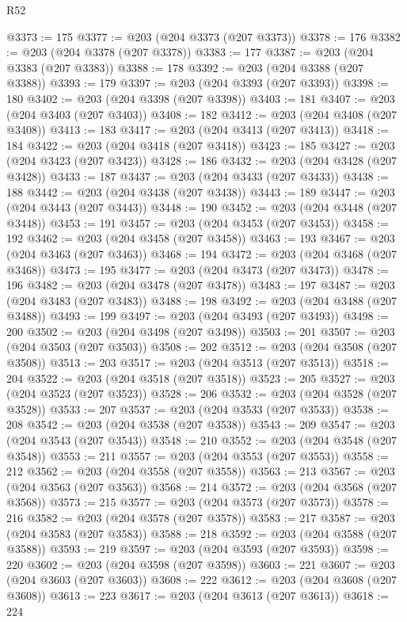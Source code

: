 \begin{lexlean}{R52}
\begin{coremodule}
{{{{{{{{{{{{{{{{{{{{{{{{{{{{{{{{{{{{{{{{{{{{{{{{{{{{{{{{{{{{{{{{{{{{{{{{{{{{{{{{{{{{{{{{{{{{{{{{{{{{{{{{{{{{{{{{{{{{{{{{{{{{{{{{{{{{{{{{{{{{{{{{{{{{{{{{{{{{{{{{{{{{{{{{{{{{{{{{{{{{{{{{{{{{{{{{{{{{{{@3373 := 175
@3377 := @203 (@204 @3373 (@207 @3373))
@3378 := 176
@3382 := @203 (@204 @3378 (@207 @3378))
@3383 := 177
@3387 := @203 (@204 @3383 (@207 @3383))
@3388 := 178
@3392 := @203 (@204 @3388 (@207 @3388))
@3393 := 179
@3397 := @203 (@204 @3393 (@207 @3393))
@3398 := 180
@3402 := @203 (@204 @3398 (@207 @3398))
@3403 := 181
@3407 := @203 (@204 @3403 (@207 @3403))
@3408 := 182
@3412 := @203 (@204 @3408 (@207 @3408))
@3413 := 183
@3417 := @203 (@204 @3413 (@207 @3413))
@3418 := 184
@3422 := @203 (@204 @3418 (@207 @3418))
@3423 := 185
@3427 := @203 (@204 @3423 (@207 @3423))
@3428 := 186
@3432 := @203 (@204 @3428 (@207 @3428))
@3433 := 187
@3437 := @203 (@204 @3433 (@207 @3433))
@3438 := 188
@3442 := @203 (@204 @3438 (@207 @3438))
@3443 := 189
@3447 := @203 (@204 @3443 (@207 @3443))
@3448 := 190
@3452 := @203 (@204 @3448 (@207 @3448))
@3453 := 191
@3457 := @203 (@204 @3453 (@207 @3453))
@3458 := 192
@3462 := @203 (@204 @3458 (@207 @3458))
@3463 := 193
@3467 := @203 (@204 @3463 (@207 @3463))
@3468 := 194
@3472 := @203 (@204 @3468 (@207 @3468))
@3473 := 195
@3477 := @203 (@204 @3473 (@207 @3473))
@3478 := 196
@3482 := @203 (@204 @3478 (@207 @3478))
@3483 := 197
@3487 := @203 (@204 @3483 (@207 @3483))
@3488 := 198
@3492 := @203 (@204 @3488 (@207 @3488))
@3493 := 199
@3497 := @203 (@204 @3493 (@207 @3493))
@3498 := 200
@3502 := @203 (@204 @3498 (@207 @3498))
@3503 := 201
@3507 := @203 (@204 @3503 (@207 @3503))
@3508 := 202
@3512 := @203 (@204 @3508 (@207 @3508))
@3513 := 203
@3517 := @203 (@204 @3513 (@207 @3513))
@3518 := 204
@3522 := @203 (@204 @3518 (@207 @3518))
@3523 := 205
@3527 := @203 (@204 @3523 (@207 @3523))
@3528 := 206
@3532 := @203 (@204 @3528 (@207 @3528))
@3533 := 207
@3537 := @203 (@204 @3533 (@207 @3533))
@3538 := 208
@3542 := @203 (@204 @3538 (@207 @3538))
@3543 := 209
@3547 := @203 (@204 @3543 (@207 @3543))
@3548 := 210
@3552 := @203 (@204 @3548 (@207 @3548))
@3553 := 211
@3557 := @203 (@204 @3553 (@207 @3553))
@3558 := 212
@3562 := @203 (@204 @3558 (@207 @3558))
@3563 := 213
@3567 := @203 (@204 @3563 (@207 @3563))
@3568 := 214
@3572 := @203 (@204 @3568 (@207 @3568))
@3573 := 215
@3577 := @203 (@204 @3573 (@207 @3573))
@3578 := 216
@3582 := @203 (@204 @3578 (@207 @3578))
@3583 := 217
@3587 := @203 (@204 @3583 (@207 @3583))
@3588 := 218
@3592 := @203 (@204 @3588 (@207 @3588))
@3593 := 219
@3597 := @203 (@204 @3593 (@207 @3593))
@3598 := 220
@3602 := @203 (@204 @3598 (@207 @3598))
@3603 := 221
@3607 := @203 (@204 @3603 (@207 @3603))
@3608 := 222
@3612 := @203 (@204 @3608 (@207 @3608))
@3613 := 223
@3617 := @203 (@204 @3613 (@207 @3613))
@3618 := 224
}}}}}}}}}}}}}}}}}}}}}}}}}}}}}}}}}}}}}}}}}}}}}}}}}}}}}}}}}}}}}}}}}}}}}}}}}}}}}}}}}}}}}}}}}}}}}}}}}}}}}}}}}}}}}}}}}}}}}}}}}}}}}}}}}}}}}}}}}}}}}}}}}}}}}}}}}}}}}}}}}}}}}}}}}}}}}}}}}}}}}}}}}}}}}}}}}}}}}}
\end{coremodule}
\end{lexlean}
